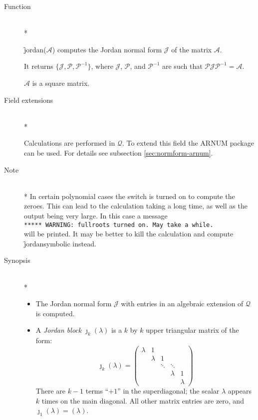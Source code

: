\begin{description}
\item[Function]\mbox{}\\*

\f{jordan}($\mathcal{A}$) computes the Jordan normal form 
$\mathcal{J}$ of the matrix $\mathcal{A}$.

It returns $\{\mathcal{J}, \mathcal{P}, \mathcal{P}^{-1}\}$, where 
$\mathcal{J}$, $\mathcal{P}$, and $\mathcal{P}^{-1}$ are such that $\mathcal{P J P}^
{-1} = \mathcal{A}$. 

$\mathcal{A}$ is a square matrix.

\item[Field extensions]\mbox{}\\*

Calculations are performed in $\mathcal{Q}$. To extend this field the 
{\small ARNUM} package can be used. For details see subsection \ref{sec:normform-arnum}.

\item[Note]\mbox{}\\*
In certain polynomial cases the switch  is turned on to compute the 
zeroes. This can lead to the calculation taking a long time, as well as 
the output being very large. In this case a message \\
\verb|***** WARNING: fullroots turned on. May take a while.|\\
will be printed. It may be 
better to kill the calculation and compute \f{jordansymbolic} instead.

\item[Synopsis]\mbox{}\\*

\begin{itemize}
\item The Jordan normal form $\mathcal{J}$ with entries in an algebraic 
      extension of $\mathcal{Q}$ is computed.

\item A \emph{Jordan block} ${\jmath}_{k}(\lambda)$ is a $k$ by $k$ 
      upper triangular matrix of the form:
%
      \begin{displaymath}
      {\jmath}_{k}(\lambda) = \begin{pmatrix} \lambda & 1 
      &  &  & \\  &  \lambda & 1  & & \\ & 
      & \ddots & \ddots & \\ &  &  &  \lambda & 1 \\ &
      &  &  & \lambda \end{pmatrix} 
      \end{displaymath}
%      
      There are $k-1$ terms ``$+1$'' in the superdiagonal; the scalar 
      $\lambda$ appears $k$ times on the main diagonal. All other 
      matrix entries are zero, and ${\jmath}_{1}(\lambda) = (\lambda)$.


\end{itemize}
\end{description}
